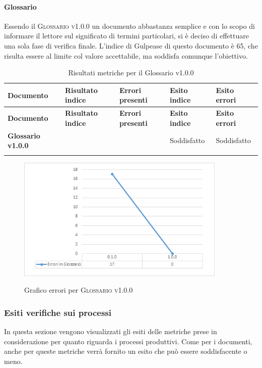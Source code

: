 \documentclass[../piano-di-qualifica.tex]{subfiles}
\begin{document}
\paragraph{Glossario}
\label{sub:glossario}
Essendo il \textsc{Glossario v1.0.0} un documento abbastanza semplice e con lo scopo di informare il lettore sul significato di termini particolari, si è deciso di effettuare una sola fase di verifica finale.     
L'indice di Gulpease di questo documento è 65, che risulta essere al limite col valore accettabile, ma soddisfa comunque l'obiettivo.

\renewcommand{\arraystretch}{2} %
\begin{longtable}[H]{>{\centering\bfseries}m{6cm} >{\centering}m{2cm} >{\centering}m{2.5cm} >{\centering}m{2.5cm} >{\centering\arraybackslash}m{2.5cm}}  
  \rowcolor{lightgray}
  {\textbf{Documento}} & {\textbf{Risultato indice}} & {\textbf{Errori presenti}} & {\textbf{Esito indice}} & {\textbf{Esito errori}}  \\
  \endfirsthead%
  \rowcolor{lightgray}
  {\textbf{Documento}} & {\textbf{Risultato indice}} & {\textbf{Errori presenti}} & {\textbf{Esito indice}} & {\textbf{Esito errori}}  \\
  \endhead%
  \textbf{Glossario v1.0.0} & 65                 & 0               & Soddisfatto & Soddisfatto \\
  \caption{Risultati metriche per il Glossario v1.0.0}
  \label{tab:my-table}
\end{longtable}

\begin{figure}[H]
  \centering
  \includegraphics[width=10cm]{img/erroriGlossario.png}
  \label{fig:scice_documenti}
  \caption{Grafico errori per \textsc{Glossario v1.0.0}}
\end{figure}

\subsubsection{Esiti verifiche sui processi}
\label{sub:esiti_verifiche_sui_processi}
In questa sezione vengono visualizzati gli esiti delle metriche prese in considerazione per quanto riguarda i processi produttivi.
Come per i documenti, anche per queste metriche verrà fornito un esito che può essere soddisfacente o meno.
\end{document}
